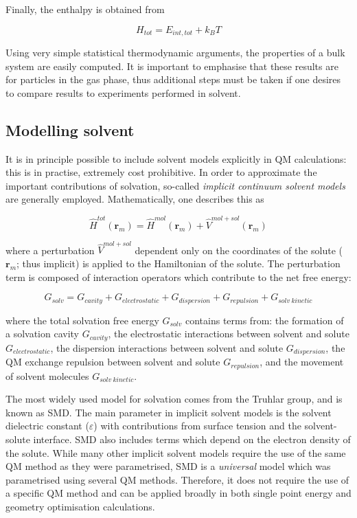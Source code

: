 \noindent Finally, the enthalpy is obtained from

\begin{equation}
  H_{tot} = E_{int,tot} + k_BT
\end{equation}

Using very simple statistical thermodynamic arguments, the properties of a bulk
system are easily computed. It is important to emphasise that these results are
for particles in the gas phase, thus additional steps must be taken if one
desires to compare results to experiments performed in solvent.

\subsection{Modelling solvent}

It is in principle possible to include solvent models explicitly in QM
calculations: this is in practise, extremely cost prohibitive. In order to
approximate the important contributions of solvation, so-called \emph{implicit
  continuum solvent models} are generally
employed.\cite{Mennucci2007,Cramer2004} Mathematically, one describes this as

\begin{equation}
  \hat{H}^{tot}(\mathbf{r}_m) = \hat{H}^{mol}(\mathbf{r}_m) + \hat{V}^{mol+sol}(\mathbf{r}_m)
\end{equation}

\noindent where a perturbation $\hat{V}^{mol+sol}$ dependent only on the
coordinates of the solute ($\mathbf{r}_m$; thus implicit) is applied to the
Hamiltonian of the solute. The perturbation term is composed of interaction
operators which contribute to the net free energy:

\begin{equation}
G_{solv} = G_{cavity} + G_{electrostatic} + G_{dispersion} + G_{repulsion} +
G_{solv~kinetic}
\end{equation}

\noindent where the total solvation free energy $G_{solv}$ contains terms from:
the formation of a solvation cavity $G_{cavity}$, the electrostatic interactions
between solvent and solute $G_{electrostatic}$, the dispersion interactions
between solvent and solute $G_{dispersion}$, the QM exchange repulsion between
solvent and solute $G_{repulsion}$, and the movement of solvent molecules
$G_{solv~kinetic}$.

The most widely used model for solvation comes from the Truhlar group, and is
known as SMD.\cite{Marenich2009} The main parameter in implicit solvent models
is the solvent dielectric constant ($\varepsilon$) with contributions from
surface tension and the solvent-solute interface. SMD also includes terms which
depend on the electron density of the solute.  While many other implicit solvent
models require the use of the same QM method as they were
parametrised,\cite{Ho2010} SMD is a \emph{universal} model which was
parametrised using several QM methods. Therefore, it does not require the use of
a specific QM method and can be applied broadly in both single point energy and
geometry optimisation calculations.

